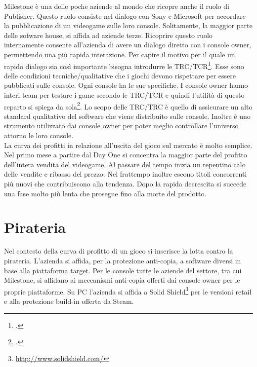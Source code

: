 Milestone è una delle poche aziende al mondo che ricopre anche il ruolo di Publisher. Questo ruolo consiste nel dialogo con Sony e Microsoft per accordare la pubblicazione di un videogame sulle loro console. Solitamente, la maggior parte delle sotware house, si affida ad aziende terze. Ricoprire questo ruolo internamente consente all'azienda di avere un dialogo diretto con i console owner, permettendo una più rapida interazione. Per capire il motivo per il quale un rapido dialogo sia così importante bisogna introdurre le \gls{TRC/TCR}\footcite{site:approfondimento-TRC}. Esse sono delle condizioni tecniche/qualitative che i giochi devono rispettare per essere pubblicati sulle console. Ogni console ha le sue specifiche. I console owner hanno interi team per testare i game secondo le TRC/TCR e quindi l'utilità di questo reparto si spiega da sola\footcite{site:approfondimento-game-testing}. Lo scopo delle TRC/TRC è quello di assicurare un alto standard qualitativo del software che viene distribuito sulle console. Inoltre è uno strumento utilizzato dai console owner per poter meglio controllare l'universo attorno le loro console.\\

La curva dei profitti in relazione all'uscita del gioco sul mercato è molto semplice. Nel primo mese a partire dal \gls{Day One} si concentra la maggior parte del profitto dell'intera vendita del videogame. Al passare del tempo inizia un repentino calo delle vendite e ribasso del prezzo. Nel frattempo inoltre escono titoli concorrenti più nuovi che contribuiscono alla tendenza. Dopo la rapida decrescita si succede una fase molto più lenta che prosegue fino alla morte del prodotto.


\section{Pirateria}

Nel contesto della curva di profitto di un gioco si inserisce la lotta contro la pirateria. L'azienda si affida, per la protezione anti-copia, a software diversi in base alla piattaforma target. Per le console tutte le aziende del settore, tra cui Milestone, si affidano ai meccanismi anti-copia offerti dai console owner per le proprie piattaforme. Su PC l'azienda si affida a Solid Shield\footnote{\url{http://www.solidshield.com/}} per le versioni retail e alla protezione build-in offerta da Steam.\\

